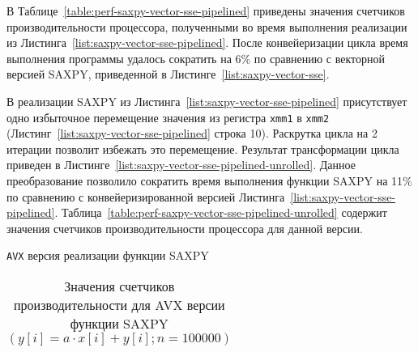 В Таблице~\ref{table:perf-saxpy-vector-sse-pipelined} приведены значения счетчиков производительности процессора, полученными во время выполнения реализации из Листинга~\ref{list:saxpy-vector-sse-pipelined}. После конвейеризации цикла время выполнения программы удалось сократить на 6\% по сравнению с векторной версией SAXPY, приведенной в Листинге~\ref{list:saxpy-vector-sse}.

В реализации SAXPY из Листинга~\ref{list:saxpy-vector-sse-pipelined} присутствует одно избыточное перемещение значения из регистра \texttt{xmm1} в \texttt{xmm2} (Листинг~\ref{list:saxpy-vector-sse-pipelined} строка 10). Раскрутка цикла на 2 итерации позволит избежать это перемещение. Результат трансформации цикла приведен в Листинге~\ref{list:saxpy-vector-sse-pipelined-unrolled}. Данное преобразование позволило сократить время выполнения функции SAXPY на 11\% по сравнению с конвейеризированной версией Листинга~\ref{list:saxpy-vector-sse-pipelined}. Таблица~\ref{table:perf-saxpy-vector-sse-pipelined-unrolled} содержит значения счетчиков производительности процессора для данной версии.

\begin{ListingEnv}[h!t]
	
	
    \caption{\texttt{AVX} версия реализации функции SAXPY}
    \label{list:saxpy-vector-avx}
\end{ListingEnv}

\begin{table} [!h]
  \centering
  \captionsetup{width=15cm}
  \caption{Значения счетчиков производительности для AVX версии функции SAXPY
  $(y[i] = a \cdot x[i] + y[i]; n = 100000)$}\label{table:perf-saxpy-vector-avx}%
\begin{tabular}{  | p{0.09\linewidth} | p{0.09\linewidth} | p{0.09\linewidth} |
p{0.13\linewidth} | p{0.09\linewidth} | p{0.09\linewidth} | p{0.09\linewidth} |
p{0.09\linewidth}l | }
\hline
\hline

\hline
\hline
  \end{tabular}
\end{table}

